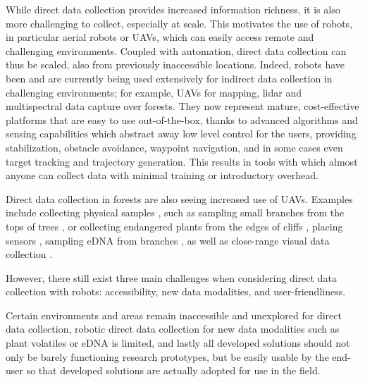While direct data collection provides increased information richness, it is also more challenging to collect, especially at scale. 
This motivates the use of robots, in particular aerial robots or UAVs, which can easily access remote and challenging environments. Coupled with automation, direct data collection can thus be scaled, also from previously inaccessible locations.
Indeed, robots have been and are currently being used extensively for indirect data collection in challenging environments; for example, UAVs for mapping, lidar and multispectral data capture over forests. They now represent mature, cost-effective platforms that are easy to use out-of-the-box, thanks to advanced algorithms and sensing capabilities which abstract away low level control for the users, providing stabilization, obstacle avoidance, waypoint navigation, and in some cases even target tracking and trajectory generation. This results in tools with which almost anyone can collect data with minimal training or introductory overhead. 






Direct data collection in forests are also seeing increased use of UAVs.
Examples include collecting physical samples \cite{Krasylenko2023}, such as sampling small branches from the tops of trees \cite{Charron2020}, or collecting endangered plants from the edges of cliffs \cite{LaVigne2022}, placing sensors \cite{Hamaza2020, Farinha2020}, sampling eDNA from branches \cite{Aucone2023a}, as well as close-range visual data collection \cite{Liu2022, Zhou2022}.

However, there still exist three main challenges when considering direct data collection with robots: accessibility, new data modalities, and user-friendliness.

Certain environments and areas remain inaccessible and unexplored for direct data collection, robotic direct data collection for new data modalities such as plant volatiles or eDNA is limited, and lastly all developed solutions should not only be barely functioning research prototypes, but be easily usable by the end-user so that developed solutions are actually adopted for use in the field.


